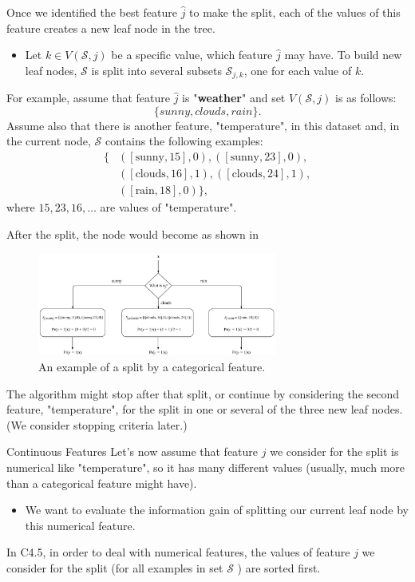 \documentclass[9pt,dvipsnames]{beamer}
\begin{document}
	\begin{frame}
		Once we identified the best feature $\hat{j}$ to make the split, each of the values of this feature creates a new leaf node in the tree. 
		\begin{itemize}
			\item Let $k \in V(\mathcal{S}, j)$ be a specific value, which feature $\hat{j}$ may have. To build new leaf nodes, $\mathcal{S}$ is split into several subsets $\mathcal{S}_{j, k}$, one for each value of $k$.
		\end{itemize}
		For example, assume that feature $\hat{j}$ is "\textbf{weather}" and set $V(\mathcal{S}, j)$ is as follows: $$\{ sunny, clouds, rain \}.$$
		Assume also that there is another feature, "temperature", in this dataset and, in the current node, $\mathcal{S}$ contains the following examples:
		\begin{align*}
			\{ & ([\text{sunny}, 15], 0), ([\text{sunny}, 23], 0), \\
			& ([\text{clouds}, 16], 1), ([\text{clouds}, 24], 1), \\
			& ([\text{rain}, 18], 0) \},
		\end{align*}
		where $15,23,16, \ldots$ are values of "temperature". 
	\end{frame}
	
	\begin{frame}
		After the split, the node would become as shown in 
		\begin{figure}
			\centering
			\includegraphics[width=0.7\textwidth]{imgs/algorithm_5.jpg}
			\caption{An example of a split by a categorical feature.}
		\end{figure}
		The algorithm might stop after that split, or continue by considering the second feature, "temperature", for the split in one or several of the three new leaf nodes. (We consider stopping criteria later.)
	\end{frame}
	
	\begin{frame}{Continuous Features}
		Let's now assume that feature $j$ we consider for the split is numerical like "temperature", so it has many different values (usually, much more than a categorical feature might have). 
		\begin{itemize}
			\item We want to evaluate the information gain of splitting our current leaf node by this numerical feature.
		\end{itemize}
		In C4.5, in order to deal with numerical features, the values of feature $j$ we consider for the split (for all examples in set $\mathcal{S}$ ) are sorted first.
	\end{frame}
	
\end{document}
